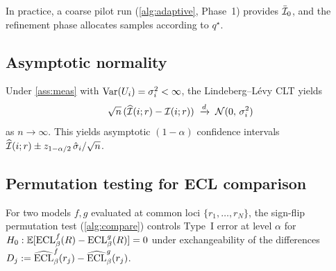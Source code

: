 In practice, a coarse pilot run (\cref{alg:adaptive}, Phase~1) provides $\bar{\mathcal{I}}_0$, and the refinement phase allocates samples according to $q^\star$.

\subsection{Asymptotic normality}

\begin{theorem}\label{thm:clt}
Under \cref{ass:meas} with $\operatorname{Var}(U_i) = \sigma_i^2 < \infty$, the Lindeberg--L\'evy CLT yields
\[
\sqrt{n}\,(\widehat{\mathcal{I}}(i;r) - \mathcal{I}(i;r)) \;\xrightarrow{d}\; \mathcal{N}(0,\, \sigma_i^2)
\]
as $n\to\infty$. This yields asymptotic $(1-\alpha)$ confidence intervals $\widehat{\mathcal{I}}(i;r) \pm z_{1-\alpha/2}\,\hat{\sigma}_i/\sqrt{n}$.
\end{theorem}

\subsection{Permutation testing for ECL comparison}

\begin{proposition}\label{prop:permtest}
For two models $f,g$ evaluated at common loci $\{r_1,\dots,r_N\}$, the sign-flip permutation test (\cref{alg:compare}) controls Type~I error at level $\alpha$ for $H_0: \mathbb{E}[\mathrm{ECL}_\beta^f(R) - \mathrm{ECL}_\beta^g(R)] = 0$ under exchangeability of the differences $D_j := \widehat{\mathrm{ECL}}_\beta^f(r_j) - \widehat{\mathrm{ECL}}_\beta^g(r_j)$.
\end{proposition}
